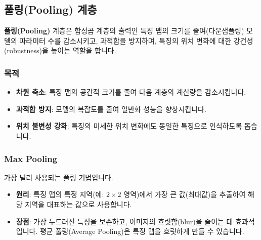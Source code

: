 \documentclass[11pt,a4paper]{article}
\begin{document}
\subsection{풀링(Pooling) 계층}

\begin{conceptbox}
\textbf{풀링(Pooling)} 계층은 합성곱 계층의 출력인 특징 맵의 크기를 줄여(다운샘플링) 모델의 파라미터 수를 감소시키고, 과적합을 방지하며, 특징의 위치 변화에 대한 강건성(robustness)을 높이는 역할을 합니다.
\end{conceptbox}

\subsubsection{목적}
\begin{itemize}
    \item \textbf{차원 축소}: 특징 맵의 공간적 크기를 줄여 다음 계층의 계산량을 감소시킵니다.
    \item \textbf{과적합 방지}: 모델의 복잡도를 줄여 일반화 성능을 향상시킵니다.
    \item \textbf{위치 불변성 강화}: 특징의 미세한 위치 변화에도 동일한 특징으로 인식하도록 돕습니다.
\end{itemize}

\subsubsection{Max Pooling}
가장 널리 사용되는 풀링 기법입니다.
\begin{itemize}
    \item \textbf{원리}: 특징 맵의 특정 지역(예: $2 \times 2$ 영역)에서 가장 큰 값(최대값)을 추출하여 해당 지역을 대표하는 값으로 사용합니다.
    \item \textbf{장점}: 가장 두드러진 특징을 보존하고, 이미지의 흐릿함(blur)을 줄이는 데 효과적입니다. 평균 풀링(Average Pooling)은 특징 맵을 흐릿하게 만들 수 있습니다.
\end{itemize}
\end{document}
